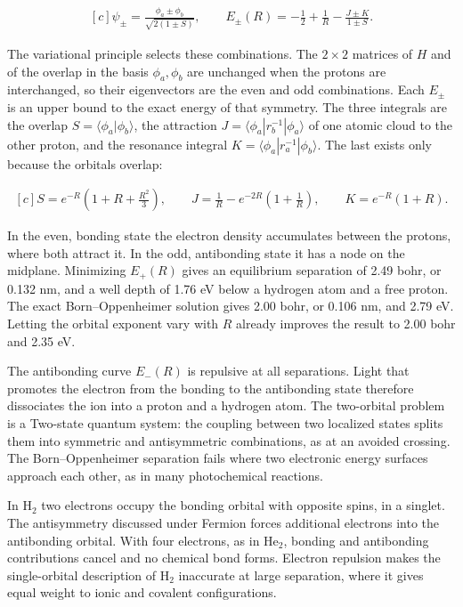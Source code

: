 \documentclass[11pt,oneside]{book}
\newenvironment{centeredalign}{\[\begin{gathered}[c]}{\end{gathered}\]}
\begin{document}
\begin{centeredalign}
\psi_\pm=\frac{\phi_a\pm\phi_b}{\sqrt{2(1\pm S)}},\qquad
E_\pm(R)=-\frac12+\frac1R-\frac{J\pm K}{1\pm S}.
\end{centeredalign}

The variational principle selects these combinations. The \(2\times2\) matrices of \(H\) and of the overlap in the basis \(\phi_a,\phi_b\) are unchanged when the protons are interchanged, so their eigenvectors are the even and odd combinations. Each \(E_\pm\) is an upper bound to the exact energy of that symmetry. The three integrals are the overlap \(S=\langle\phi_a|\phi_b\rangle\), the attraction \(J=\langle\phi_a|r_b^{-1}|\phi_a\rangle\) of one atomic cloud to the other proton, and the resonance integral \(K=\langle\phi_a|r_a^{-1}|\phi_b\rangle\). The last exists only because the orbitals overlap:

\begin{centeredalign}
S=e^{-R}\left(1+R+\frac{R^2}{3}\right),\qquad
J=\frac1R-e^{-2R}\left(1+\frac1R\right),\qquad
K=e^{-R}(1+R).
\end{centeredalign}

In the even, bonding state the electron density accumulates between the protons, where both attract it. In the odd, antibonding state it has a node on the midplane. Minimizing \(E_+(R)\) gives an equilibrium separation of 2.49 bohr, or 0.132 nm, and a well depth of 1.76 eV below a hydrogen atom and a free proton. The exact Born--Oppenheimer solution gives 2.00 bohr, or 0.106 nm, and 2.79 eV. Letting the orbital exponent vary with \(R\) already improves the result to 2.00 bohr and 2.35 eV.

The antibonding curve \(E_-(R)\) is repulsive at all separations. Light that promotes the electron from the bonding to the antibonding state therefore dissociates the ion into a proton and a hydrogen atom. The two-orbital problem is a Two-state quantum system: the coupling between two localized states splits them into symmetric and antisymmetric combinations, as at an avoided crossing. The Born--Oppenheimer separation fails where two electronic energy surfaces approach each other, as in many photochemical reactions.

In \(\mathrm H_2\) two electrons occupy the bonding orbital with opposite spins, in a singlet. The antisymmetry discussed under Fermion forces additional electrons into the antibonding orbital. With four electrons, as in \(\mathrm{He}_2\), bonding and antibonding contributions cancel and no chemical bond forms. Electron repulsion makes the single-orbital description of \(\mathrm H_2\) inaccurate at large separation, where it gives equal weight to ionic and covalent configurations.
\end{document}
